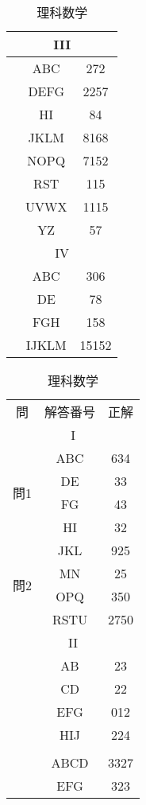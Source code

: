 \documentclass{jsarticle}
\begin{document}
\begin{CJK}{UTF8}{min}
\begin{table}[htbp]
\begin{minipage}[t]{0.48\textwidth}
\begin{tabular}{|c|c|c|}
\hline
\multicolumn{3}{|c|}{III} \\
\hline
 & \textsf{ABC} & 272 \\
 & \textsf{DEFG} & 2257 \\
 & \textsf{HI} & 84 \\
 & \textsf{JKLM} & 8168 \\
 & \textsf{NOPQ} & 7152 \\
 & \textsf{RST} & 115 \\
 & \textsf{UVWX} & 1115 \\
 & \textsf{YZ} & 57 \\
\hline
\multicolumn{3}{|c|}{IV} \\
\hline
 & \textsf{ABC} & 306\\
 & \textsf{DE} & 78 \\
 & \textsf{FGH} & 158 \\
 & \textsf{IJKLM} & 15152\\
\hline
\end{tabular}
\end{minipage}
\hfill
\begin{minipage}[t]{0.48\textwidth}
\centering
\caption*{理科数学}
\begin{tabular}{|c|c|c|}
\hline
\multirow{2}{*}{問} & \multirow{2}{*}{解答番号} & \multirow{2}{*}{正解} \\
 &  & \\
\hline
\multicolumn{3}{|c|}{I} \\
\hline
\multirow{4}{*}{問1} 
 & \textsf{ABC} & 634 \\
 & \textsf{DE} & 33\\
 & \textsf{FG} & 43 \\
 & \textsf{HI} & 32 \\
\hline
\multirow{4}{*}{問2} 
 & \textsf{JKL} & 925 \\
 & \textsf{MN} & 25 \\
 & \textsf{OPQ} & 350\\
 & \textsf{RSTU} & 2750 \\
\hline
\multicolumn{3}{|c|}{II} \\
\hline
\multirow{6}{*}{} 
 & \textsf{AB} & 23 \\
 & \textsf{CD} & 22 \\
 & \textsf{EFG} & 012 \\
 & \textsf{HIJ} & 224\\
\hline
\multicolumn{3}{|c|}{III} \\
\hline
 & \textsf{ABCD} & 3327 \\
 & \textsf{EFG} & 323\\

\end{tabular}
\end{minipage}
\end{table}
\end{CJK}
\end{document}
